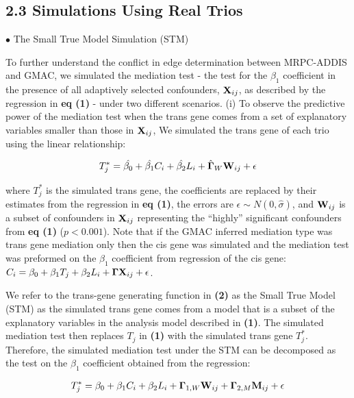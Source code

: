 \documentclass[
]{article}
\begin{document}
\subsection*{2.3 Simulations Using Real Trios}

\indent \(\bullet\) The Small True Model Simulation (STM)

To further understand the conflict in edge determination between
MRPC-ADDIS and GMAC, we simulated the mediation test - the test for the
\(\beta_1\) coefficient in the presence of all adaptively selected
confounders, \({\bf X}_{ij}\), as described by the regression in
\textbf{eq (1)} - under two different scenarios. (i) To observe the
predictive power of the mediation test when the trans gene comes from a
set of explanatory variables smaller than those in \({\bf X}_{ij}\), We
simulated the trans gene of each trio using the linear relationship:

\begin{eqnarray} T^{\ast}_{j} = \hat{\beta_0}+\hat{\beta_1}C_i + \hat{\beta_2}L_i + \hat{{\bf\Gamma}}_W {\bf W}_{ij} +\epsilon  \end{eqnarray}

where \(T^{\ast}_{j}\) is the simulated trans gene, the coefficients are
replaced by their estimates from the regression in \textbf{eq (1)}, the
errors are \(\epsilon \sim N(0, \hat{\sigma})\), and \({\bf W}_{ij}\) is
a subset of confounders in \({\bf X}_{ij}\) representing the ``highly''
significant confounders from \textbf{eq (1)} (\(p<0.001\)). Note that if
the GMAC inferred mediation type was trans gene mediation only then the
cis gene was simulated and the mediation test was preformed on the
\(\beta_1\) coefficient from regression of the cis gene:
\(C_i = \beta_0 + \beta_1T_j + \beta_2L_i + {\bf \Gamma X}_{ij}+\epsilon\).

We refer to the trans-gene generating function in \textbf{(2)} as the
Small True Model (STM) as the simulated trans gene comes from a model
that is a subset of the explanatory variables in the analysis model
described in \textbf{(1)}. The simulated mediation test then replaces
\(T_j\) in \textbf{(1)} with the simulated trans gene \(T^{\ast}_j\).
Therefore, the simulated mediation test under the STM can be decomposed
as the test on the \(\beta_1\) coefficient obtained from the regression:

\begin{eqnarray} T^{\ast}_{j} = \beta_0+\beta_1C_i + \beta_2L_i + {\bf\Gamma}_{1,W} {\bf W}_{ij} + {\bf \Gamma}_{2,M}{\bf M}_{ij} +\epsilon \end{eqnarray}
\end{document}
